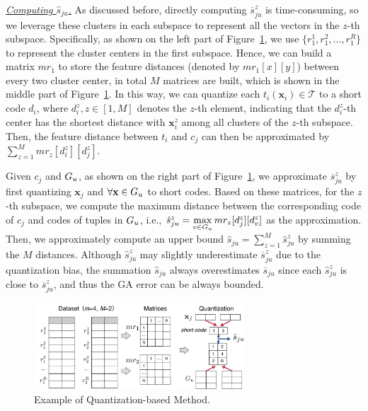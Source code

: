 \noindent  \underline{\textit{Computing $\hat{s}_{ju}$.}}
As discussed before,
directly computing $\overline{s}_{ju}^z$ is time-consuming, so we leverage these  clusters in each subspace to represent all the vectors in the $z$-th subspace. %
%
 Specifically, as shown on the left part of Figure~\ref{fig:codebook}, we use $\{r_1^1, r_1^2,..., r_1^R\}$ to represent the  cluster centers in the first subspace. %
 Hence, we can build a matrix $mr_1$ to store the feature distances (denoted by $mr_1[x][y]$) between every two cluster center, in total  $M$ matrices are built, which is shown in the middle part of Figure~\ref{fig:codebook}.
 In this way, we can quantize each $t_i (\mathbf{x}_i) \in \mathcal{T}$  to a short code $d_i$, where $d_i^z, z\in[1,M]$  denotes the $z$-th element, indicating that the $d_i^z$-th center has the shortest distance with $\mathbf{x}_i^z$ among all clusters of the $z$-th subspace. 
 Then, the feature distance between  $t_i$ and $c_j$ can then be approximated by $\sum_{z=1}^{M}mr_z[d_i^z][d_j^z]$.

Given $c_j$ and $G_u$, as shown on the right part of Figure~\ref{fig:codebook}, we approximate $\overline{s}_{ju}^z$ by first quantizing $\mathbf{x}_{j}$ and  $\forall \mathbf{x} \in G_u$ to short codes. Based on these matrices, for the $z$-th subspace, we compute the maximum distance between the corresponding code of $c_j$ and codes of tuples in $G_u$, i.e., $\hat{s}_{ju}^z = \max\limits_{v\in G_u}mr_z[d_{j}^z][d_v^z]$ as the approximation. Then, we approximately compute an upper bound $\hat{s}_{ju}=\sum_{z=1}^{M}\hat{s}_{ju}^z$ by summing the $M$ distances. Although $\hat{s}_{ju}^z$ may slightly underestimate $\overline{s}^z_{ju}$ due to the quantization bias, the summation $\hat{s}_{ju}$ always overestimates $\overline{s}_{ju}$ since each $\hat{s}_{ju}^z$ is close to $\overline{s}^z_{ju}$, and thus the GA error can be always bounded.

\begin{figure}[t]
    \centering
    \includegraphics[width=0.7\textwidth]{figs/pq}
    \caption{Example of  Quantization-based Method.}
    \label{fig:codebook}
\end{figure}



